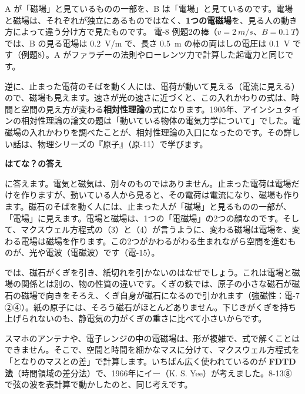 A が「磁場」と見ているものの一部を、B は「電場」と見ているのです。電場と磁場は、それぞれが独立にあるものではなく、\textbf{1つの電磁場}を、見る人の動き方によって違う分け方で見たものです。
\label{ph:電-14:Edash}電-8 例題2の棒（$v=\qty{2}{m/s}$、$B=\qty{0.1}{T}$）では、B の見る電場は \qty{0.2}{V/m} で、長さ \qty{0.5}{m} の棒の両はしの電圧は \qty{0.1}{V} です（例題8）。A がファラデーの法則やローレンツ力で計算した起電力と同じです。

逆に、止まった電荷のそばを動く人には、電荷が動いて見える（電流に見える）ので、磁場も見えます。速さが光の速さに近づくと、この入れかわりの式は、時間と空間の見え方が変わる\textbf{相対性理論}の式になります。1905年、アインシュタインの相対性理論の論文の題は「動いている物体の電気力学について」でした。電磁場の入れかわりを調べたことが、相対性理論の入口になったのです。その詳しい話は、物理シリーズの『原子』（原-11）で学びます。

\noindent\textbf{はてな？の答え}\par\nobreak
\label{ph:電-14:hatena}\bkhatenaref に答えます。電気と磁気は、別々のものではありません。止まった電荷は電場だけを作りますが、動いている人から見ると、その電荷は電流になり、磁場も作ります。磁石のそばを動く人には、止まった人が「磁場」と見るものの一部が、「電場」に見えます。電場と磁場は、1つの「電磁場」の2つの顔なのです。そして、マクスウェル方程式の（3）と（4）が言うように、変わる磁場は電場を、変わる電場は磁場を作ります。この2つがかわるがわる生まれながら空間を進むものが、光や電波（電磁波）です（電-15）。

では、磁石がくぎを引き、紙切れを引かないのはなぜでしょう。これは電場と磁場の関係とは別の、物の性質の違いです。くぎの鉄では、原子の小さな磁石が磁石の磁場で向きをそろえ、くぎ自身が磁石になるので引かれます（強磁性：電-7 ②④）。紙の原子には、そろう磁石がほとんどありません。下じきがくぎを持ち上げられないのも、静電気の力がくぎの重さに比べて小さいからです。


\leavevmode\label{ph:電-14:sec10}スマホのアンテナや、電子レンジの中の電磁場は、形が複雑で、式で解くことはできません。そこで、空間と時間を細かなマスに分けて、マクスウェル方程式を「となりのマスとの差」で計算します。いちばん広く使われているのが \textbf{FDTD 法}（時間領域の差分法）で、1966年にイー（K. S. Yee）が考えました。8-13⑧ で弦の波を表計算で動かしたのと、同じ考えです。

